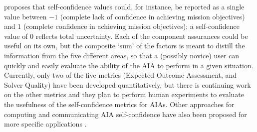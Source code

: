 \citet{Aitken2016-cv} proposes that self-confidence values could, for instance, be reported as a single value between $-1$ (complete lack of confidence in achieving mission objectives) and $1$ (complete confidence in achieving mission objectives); a self-confidence value of $0$ reflects total uncertainty. Each of the component assurances could be useful on its own, but the composite `sum' of the factors is meant to distill the information from the five different areas, so that a (possibly novice) user can quickly and easily evaluate the ability of the AIA to perform in a given situation. Currently, only two of the five metrics (Expected Outcome Assessment, and Solver Quality) have been developed quantitatively, but there is continuing work on the other metrics and they plan to perform human experiments to evaluate the usefulness of the self-confidence metrics for AIAs. Other approaches for computing and communicating AIA self-confidence have also been proposed for more specific applications \cite{Hutchins2015-if, Kaipa2015-hy, Zagorecki2015-qy, Kuter2015-qh}. 